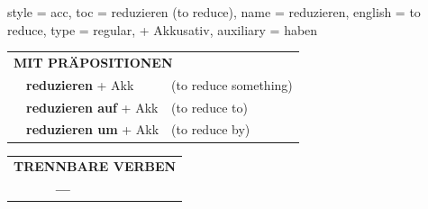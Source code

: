 \begin{verbentry}{
  style = {acc},
  toc = {reduzieren (to reduce)},
  name = {reduzieren},
  english = {to reduce},
  type = {regular, + Akkusativ},
  auxiliary = {haben}
}
\vspace{10pt}

\begin{tabular}{lll}
\multicolumn{3}{l}{\textbf{MIT PRÄPOSITIONEN}}\\
& \textbf{reduzieren} + Akk & (to reduce something)\\
& \textbf{reduzieren auf} + Akk & (to reduce to)\\
& \textbf{reduzieren um} + Akk & (to reduce by)\\
\end{tabular}
\hfill
\begin{tabular}{lll}
\multicolumn{3}{l}{\textbf{TRENNBARE VERBEN}}\\
& \textbf{---} & \\
\end{tabular}

\vspace{-5pt}
\end{verbentry}

